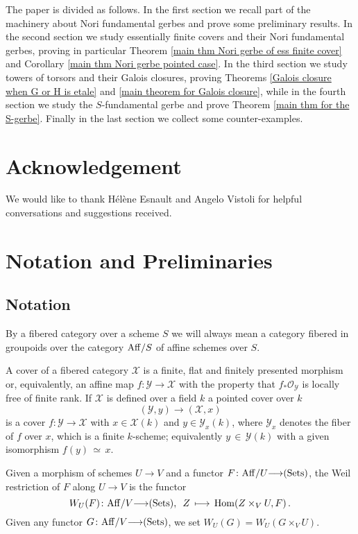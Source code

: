 \documentclass[12pt,reqno]{amsart}
\theoremstyle{plain}
\theoremstyle{definition}
\numberwithin{thm}{section}
\newcounter{x}\setcounter{x}{1}
\theoremstyle{plain}
\begin{document}
The paper is divided as follows. In the first section we recall part of the machinery about Nori fundamental gerbes and prove some preliminary results. In the second section we study essentially finite covers and their Nori fundamental gerbes, proving in particular Theorem \ref{main thm Nori gerbe of ess finite 
cover} and Corollary \ref{main thm Nori gerbe pointed case}. In the third section we study towers of torsors and their Galois closures, proving Theorems \ref{Galois closure when G or H is etale} and \ref{main theorem for Galois closure}, while in the fourth section we study the $S$-fundamental gerbe and prove Theorem \ref{main thm for the S-gerbe}. Finally in the last section we collect some counter-examples.

\section*{Acknowledgement}
 We would like to thank  H\'el\`ene Esnault and Angelo Vistoli
for helpful conversations and suggestions received.
\section{Notation and Preliminaries}

\subsection{Notation}

By a fibered category over a scheme $S$ we will always mean a category fibered in 
groupoids over the category ${{\rm Aff}}/S$ of affine schemes over $S$.

A cover of a fibered category ${\mathcal{X}}$ is a finite, flat and finitely presented
morphism or, equivalently, an affine map $f\colon {\mathcal{Y}}{\longrightarrow} {\mathcal{X}}$ with the
property that
$f_*{\mathcal{O}_{\mathcal{Y}}}$ is locally free of finite rank. If ${\mathcal{X}}$ is defined over a field
$k$ a pointed cover over $k$ $$({\mathcal{Y}},y){\longrightarrow}({\mathcal{X}},x)$$ is a cover $f\colon {\mathcal{Y}}{\longrightarrow}
{\mathcal{X}}$ with $x\in {\mathcal{X}}(k)$ and $y \in {\mathcal{Y}}_x(k)$, where ${\mathcal{Y}}_x$ denotes the fiber
of $f$ over $x$, which is a finite $k$-scheme; equivalently $y\,\in \,{\mathcal{Y}}(k)$ with
a given isomorphism $f(y) \,\simeq\, x$.

Given a morphism of schemes $U{\longrightarrow} V$ and a functor $F\colon {{\rm Aff}}/U {\longrightarrow} {(\textup{Sets})}$, 
the Weil restriction of $F$ along $U {\longrightarrow} V$ is the functor
\[
W_U(F)\colon {{\rm Aff}}/V {\longrightarrow} {(\textup{Sets})}{,\ }\ Z\,\longmapsto\, {{\rm Hom}}(Z\times_V U,F)\, .
\]
Given any functor $G\colon {{\rm Aff}}/V {\longrightarrow} {(\textup{Sets})}$, we set $W_U(G)=W_U(G\times_V U)$.
\end{document}
